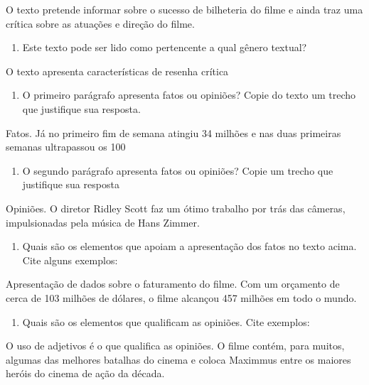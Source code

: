 {O texto pretende informar sobre o sucesso de bilheteria do filme e ainda
traz uma crítica sobre as atuações e direção do filme.

\begin{enumerate}
\def\labelenumi{\arabic{enumi})}
\setcounter{enumi}{3}
\tightlist
\item
  Este texto pode ser lido como pertencente a qual gênero textual?
\end{enumerate}

O texto apresenta características de resenha crítica

\begin{enumerate}
\def\labelenumi{\arabic{enumi})}
\setcounter{enumi}{4}
\tightlist
\item
  O primeiro parágrafo apresenta fatos ou opiniões? Copie do texto um
  trecho que justifique sua resposta.
\end{enumerate}

Fatos. Já no primeiro fim de semana atingiu 34 milhões e nas duas
primeiras semanas ultrapassou os 100

\begin{enumerate}
\def\labelenumi{\arabic{enumi})}
\setcounter{enumi}{5}
\tightlist
\item
  O segundo parágrafo apresenta fatos ou opiniões? Copie um trecho que
  justifique sua resposta
\end{enumerate}

Opiniões. O diretor Ridley Scott faz um ótimo trabalho por trás das
câmeras, impulsionadas pela música de Hans Zimmer.

\begin{enumerate}
\def\labelenumi{\arabic{enumi})}
\setcounter{enumi}{6}
\tightlist
\item
  Quais são os elementos que apoiam a apresentação dos fatos no texto
  acima. Cite alguns exemplos:
\end{enumerate}

Apresentação de dados sobre o faturamento do filme. Com um orçamento de
cerca de 103 milhões de dólares, o filme alcançou 457 milhões em todo o
mundo.

\begin{enumerate}
\def\labelenumi{\arabic{enumi})}
\setcounter{enumi}{7}
\tightlist
\item
  Quais são os elementos que qualificam as opiniões. Cite exemplos:
\end{enumerate}

O uso de adjetivos é o que qualifica as opiniões. O filme contém, para
muitos, algumas das melhores batalhas do cinema e coloca Maximmus entre
os maiores heróis do cinema de ação da década.

}
